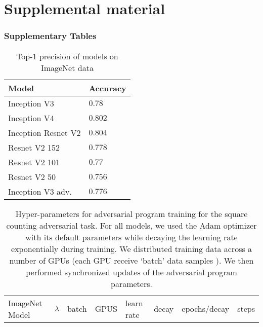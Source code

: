 \documentclass{article}
\newcommand{\jcom}[1]{{\textcolor{darkgreen}{[Jascha: #1]}}}
\begin{document}
\clearpage
\appendix
\normalsize
\onecolumn\part*{Supplemental material}\setcounter{figure}{0}\setcounter{table}{0}\section{Supplementary Tables}\label{sec: supp tables}\begin{table}[!hbt]
  \caption{Top-1 precision of models on ImageNet data}
  \label{table: ImageNet precision}
  \centering
  \begin{tabular}{ll}
    \toprule
    Model      & Accuracy \\
    \midrule
    Inception V3  &  $0.78$     \\
    Inception V4  & $0.802$     \\
    Inception Resnet V2  & $0.804$     \\
    Resnet V2 152  &  $0.778$     \\
    Resnet V2 101  &  $0.77$    \\
    Resnet V2 50 & $0.756$ \\
    Inception V3  adv. &  $0.776$     \\
    \bottomrule
  \end{tabular}
\end{table}\begin{table}
  \caption{Hyper-parameters for adversarial program training for the square counting adversarial task. For all models, we used the Adam optimizer with its default parameters while decaying the learning rate exponentially during training. We distributed training data across a number of GPUs (each GPU receive `batch' data samples ). We then performed synchronized updates of the adversarial program parameters.}
  \label{table: hyperparams count}
  \centering
  \begin{tabular}{llllllll}
    \toprule
     ImageNet Model &  $\lambda$ & batch & GPUS & learn rate & decay & epochs/decay & steps \\

\end{tabular}
\end{table}
\end{document}
